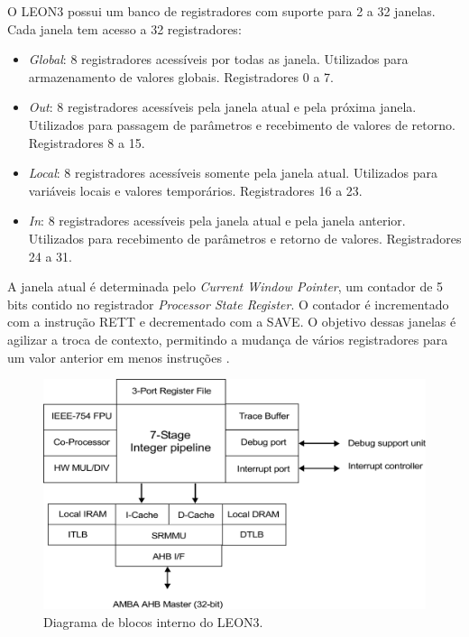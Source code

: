 O LEON3 possui um banco de registradores com suporte para 2 a 32 janelas. Cada janela tem acesso a 32 registradores:

\begin{itemize}
	\item \textit{Global}: 8 registradores acessíveis por todas as janela. Utilizados para armazenamento de valores globais. Registradores 0 a 7.
	\item \textit{Out}: 8 registradores acessíveis pela janela atual e pela próxima janela. Utilizados para passagem de parâmetros e recebimento de valores de retorno. Registradores 8 a 15.
	\item \textit{Local}: 8 registradores acessíveis somente pela janela atual. Utilizados para variáveis locais e valores temporários. Registradores 16 a 23.
	\item \textit{In}: 8 registradores acessíveis pela janela atual e pela janela anterior. Utilizados para recebimento de parâmetros e retorno de valores. Registradores 24 a 31.
\end{itemize}

A janela atual é determinada pelo \textit{Current Window Pointer}, um contador de 5 bits contido no registrador \textit{Processor State Register}. O contador é incrementado com a instrução RETT e decrementado com a SAVE. O objetivo dessas janelas é agilizar a troca de contexto, permitindo a mudança de vários registradores para um valor anterior em menos instruções \cite{sparcmanual}.

\begin{figure}
	\label{Fig:Leon3Interno}
	\caption[Diagrama de blocos interno do LEON3]{
		Diagrama de blocos interno do LEON3.}
	\begin{center}
		\includegraphics[width=\linewidth]{fig/leon3interno.pdf}
	\end{center}
\end{figure}

